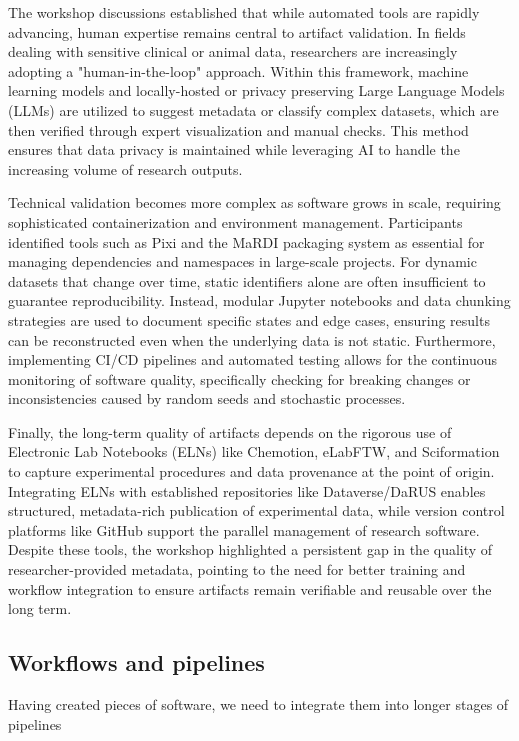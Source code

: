 \documentclass{eceasst}
\begin{document}
The workshop discussions established that while automated tools are rapidly advancing, human expertise remains central to artifact validation. In fields dealing with sensitive clinical or animal data, researchers are increasingly adopting a "human-in-the-loop" approach. Within this framework, machine learning models and locally-hosted or privacy preserving Large Language Models (LLMs) are utilized to suggest metadata or classify complex datasets, which are then verified through expert visualization and manual checks. This method ensures that data privacy is maintained while leveraging AI to handle the increasing volume of research outputs.

Technical validation becomes more complex as software grows in scale, requiring sophisticated containerization and environment management. Participants identified tools such as Pixi and the MaRDI packaging system as essential for managing dependencies and namespaces in large-scale projects. For dynamic datasets that change over time, static identifiers alone are often insufficient to guarantee reproducibility. Instead, modular Jupyter notebooks and data chunking strategies are used to document specific states and edge cases, ensuring results can be reconstructed even when the underlying data is not static. Furthermore, implementing CI/CD pipelines and automated testing allows for the continuous monitoring of software quality, specifically checking for breaking changes or inconsistencies caused by random seeds and stochastic processes.

Finally, the long-term quality of artifacts depends on the rigorous use of Electronic Lab Notebooks (ELNs) like Chemotion, eLabFTW, and Sciformation to capture  experimental procedures and data provenance at the point of origin. Integrating ELNs with established repositories like Dataverse/DaRUS enables structured, metadata-rich publication of experimental data, while version control platforms like GitHub support the parallel management of research software. Despite these tools, the workshop highlighted a persistent gap in the quality of researcher-provided metadata, pointing to the need for better training and workflow integration to ensure artifacts remain verifiable and reusable over the long term.


\subsection{Workflows and pipelines}
Having created pieces of software, we need to integrate them into longer stages of pipelines
\end{document}
